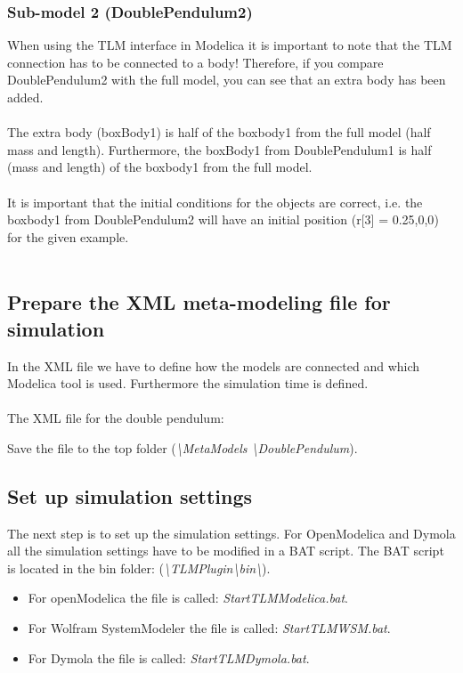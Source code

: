 \subsubsection{Sub-model 2 (DoublePendulum2)}

When using the TLM interface in Modelica it is important to note that the TLM connection has to be connected to a body! Therefore, if you compare DoublePendulum2 with the full model, you can see that an extra body has been added. \\\\The extra body (boxBody1) is half of the boxbody1 from the full model (half mass and length). Furthermore, the boxBody1 from DoublePendulum1 is half (mass and length) of the boxbody1 from the full model.\\\\It is important that the initial conditions for the objects are correct, i.e. the boxbody1 from DoublePendulum2 will have an initial position (r[3] = {0.25,0,0})  for the given example.\\\\

\subsection{Prepare the XML meta-modeling file for simulation }
In the XML file we have to define how the models are connected and which Modelica tool is used. Furthermore the simulation time is defined.\\\\The XML file for the double pendulum: ~\\

Save the file to the top folder (\textit{\textbackslash MetaModels \textbackslash DoublePendulum}).

\subsection{Set up simulation settings}
The next step is to set up the simulation settings. For OpenModelica and Dymola all the simulation settings have to be modified in a BAT script. The BAT script is located in the bin folder: (\textit{\textbackslash TLMPlugin\textbackslash bin\textbackslash}).


\begin{itemize}
  \item For openModelica the file is called: \textit{StartTLMModelica.bat}.
  \item For Wolfram SystemModeler the file is called: \textit{StartTLMWSM.bat}.
  \item For Dymola the file is called: \textit{StartTLMDymola.bat}.
\end{itemize}

